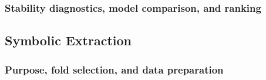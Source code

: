 \documentclass[12pt,a4paper,oneside]{article}
\begin{document}
\subsubsection{Stability diagnostics, model comparison, and ranking}\label{subsubsec:stability_ranking}

%
%
%


\subsection{Symbolic Extraction}\label{subsec:symbolic}



\subsubsection{Purpose, fold selection, and data preparation}\label{subsubsec:symbolic_setup}
\end{document}
